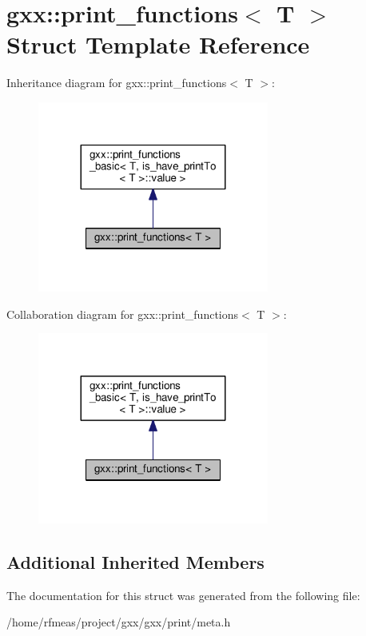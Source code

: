 \hypertarget{structgxx_1_1print__functions}{}\section{gxx\+:\+:print\+\_\+functions$<$ T $>$ Struct Template Reference}
\label{structgxx_1_1print__functions}


Inheritance diagram for gxx\+:\+:print\+\_\+functions$<$ T $>$\+:
\nopagebreak
\begin{figure}[H]
\begin{center}
\leavevmode
\includegraphics[width=215pt]{structgxx_1_1print__functions__inherit__graph}
\end{center}
\end{figure}


Collaboration diagram for gxx\+:\+:print\+\_\+functions$<$ T $>$\+:
\nopagebreak
\begin{figure}[H]
\begin{center}
\leavevmode
\includegraphics[width=215pt]{structgxx_1_1print__functions__coll__graph}
\end{center}
\end{figure}
\subsection*{Additional Inherited Members}


The documentation for this struct was generated from the following file\+:\begin{DoxyCompactItemize}
\item 
/home/rfmeas/project/gxx/gxx/print/meta.\+h\end{DoxyCompactItemize}
